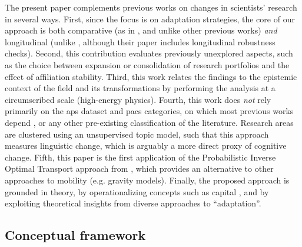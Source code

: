 \documentclass{article}
\begin{document}
The present paper complements previous works on changes in scientists' research in several ways. First, since the focus is on adaptation strategies, the core of our approach is both comparative (as in \citealt{Tripodi2020}, and unlike other previous works) \textit{and} longitudinal (unlike \citealt{Tripodi2020}, although their paper includes longitudinal robustness checks). Second, this contribution evaluates previously unexplored aspects, such as the choice between expansion or consolidation of research portfolios and the effect of affiliation stability. %
Third, this work relates the findings to the epistemic context of the field and its transformations by performing the analysis at a circumscribed scale (high-energy physics). Fourth, this work does \textit{not} rely primarily on the \gls{aps} dataset and \gls{pacs} categories, on which most previous works depend \citep{Jia2017,Aleta2019,Battiston2019,Tripodi2020}, or any other pre-existing classification of the literature. Research areas are clustered using an unsupervised topic model, such that this approach measures linguistic change, which is arguably a more direct proxy of cognitive change. Fifth, this paper is the first application of the Probabilistic Inverse Optimal Transport approach from \citealt{pmlr-v162-chiu22b}, which provides an alternative to other approaches to mobility (e.g. gravity models). Finally, the proposed approach is grounded in theory, by operationalizing concepts such as capital \citep{Bourdieu1980,Bourdieu1986}, and by exploiting theoretical insights from diverse approaches to ``adaptation''.

\subsection{\label{sec:conceptual}Conceptual framework}
\end{document}
